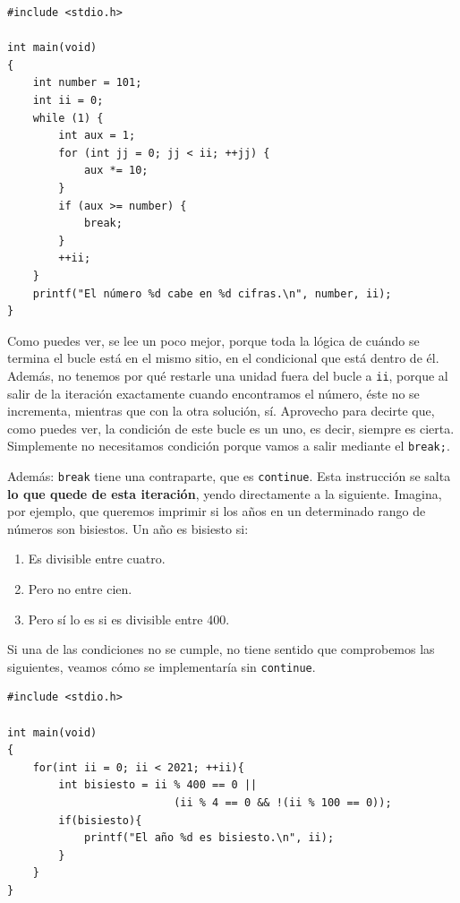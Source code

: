 \documentclass[a4paper]{article}
\begin{document}
\noindent
\begin{minipage}[H]{\linewidth}
\mbox{}
\begin{lstlisting}[style=C,
caption={Interrupción de un bucle con la instrucción \texttt{break}},
label={lst:breakExample}]
#include <stdio.h>

int main(void)
{
    int number = 101;
    int ii = 0;
    while (1) {
        int aux = 1;
        for (int jj = 0; jj < ii; ++jj) {
            aux *= 10;
        }
        if (aux >= number) {
            break;
        }
        ++ii;
    }
    printf("El número %d cabe en %d cifras.\n", number, ii);
}
\end{lstlisting}
\end{minipage}

Como puedes ver, se lee un poco mejor, porque toda la lógica de cuándo se
termina el bucle está en el mismo sitio, en el condicional que está dentro de
él. Además, no tenemos por qué restarle una unidad fuera del bucle a \verb!ii!,
porque al salir de la iteración exactamente cuando encontramos el número,
éste no se incrementa, mientras que con la otra solución, sí. Aprovecho
para decirte que, como puedes ver, la condición de este bucle es un uno,
es decir, siempre es cierta. Simplemente no necesitamos condición porque vamos
a salir mediante el \verb!break;!.

Además: \verb!break! tiene una contraparte, que es \verb!continue!. Esta
instrucción se salta \textbf{lo que quede de esta iteración}, yendo directamente
a la siguiente. Imagina, por ejemplo, que queremos imprimir si los años
en un determinado rango de números son bisiestos. Un año es bisiesto si:
\begin{enumerate}
\item Es divisible entre cuatro.
\item Pero no entre cien.
\item Pero sí lo es si es divisible entre 400.
\end{enumerate}

Si una de las condiciones no se cumple, no tiene sentido que comprobemos
las siguientes, veamos cómo se implementaría sin \verb!continue!.

\noindent
\begin{minipage}[H]{\linewidth}
\mbox{}
\begin{lstlisting}[style=C,
caption={Ejemplo de algoritmo de año bisiesto},
label={lst:lapExample}]
#include <stdio.h>

int main(void)
{
    for(int ii = 0; ii < 2021; ++ii){
        int bisiesto = ii % 400 == 0 ||
                          (ii % 4 == 0 && !(ii % 100 == 0));
        if(bisiesto){
            printf("El año %d es bisiesto.\n", ii);
        }
    }
}
\end{lstlisting}
\end{minipage}
\end{document}

